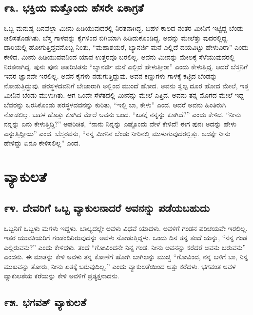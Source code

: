 \section{\num{೯೩. } ಭಕ್ತಿಯ ಮತ್ತೊಂದು ಹೆಸರೇ ಏಕಾಗ್ರತೆ}

ಒಬ್ಬ ಮನುಷ್ಯ ದಿನವೆಲ್ಲಾ ಮೀನು ಹಿಡಿಯುವುದರಲ್ಲಿ ನಿರತನಾಗಿದ್ದ. ಬಹಳ ಕಾಲದ ನಂತರ ಮೀನಿಗೆ ಇಟ್ಟಿದ್ದ ಬೆಂಡು ಚಲಿಸತೊಡಗಿತು. ಬೆಸ್ತ ಗಾಳವನ್ನು ಕೈಗಳಿಂದ ಬಿಗಿಯಾಗಿ ಹಿಡಿದುಕೊಂಡಿದ್ದ. ಅದನ್ನು ಮೇಲೆತ್ತು ವುದರಲ್ಲಿದ್ದ. ದಾರಿಯಲ್ಲಿ ಹೋಗುತ್ತಿದ್ದವನೊಬ್ಬ ನಿಂತು, “ಮಹಾಶಯರೆ, ಬ್ಯಾನರ್ಜಿ ಮನೆ ಎಲ್ಲಿದೆ ದಯವಿಟ್ಟು ಹೇಳುವಿರಾ” ಎಂದು ಕೇಳಿದ. ಮೀನು ಹಿಡಿಯುವವನಿಂದ ಯಾವ ಉತ್ತರವೂ ಬರಲಿಲ್ಲ. ಅವನು ಮೀನನ್ನು ಮೇಲಕ್ಕೆ ಸೆಳೆಯುವುದರಲ್ಲಿ ನಿರತನಾಗಿದ್ದ. ಪುನಃ ಪುನಃ ಅಪರಿಚಿತನು “ಬ್ಯಾನರ್ಜಿ ಮನೆ ಎಲ್ಲಿದೆ ಹೇಳುತ್ತೀರಾ” ಎಂದು ಕೇಳುತ್ತಿದ್ದ. ಆದರೆ ಬೆಸ್ತನಿಗೆ ಇದರ ಜ್ಞಾನವೇ ಇರಲಿಲ್ಲ. ಅವನ ಕೈಗಳು ನಡುಗುತ್ತಿದ್ದುವು. ಅವನ ಕಣ್ಣುಗಳು ಗಾಳಕ್ಕೆ ಕಟ್ಟಿದ ಬೆಂಡನ್ನು ನೋಡುತ್ತಿದ್ದುವು. ಪರಸ್ಥಳದವನಿಗೆ ಬೇಜಾರಾಗಿ ಅಲ್ಲಿಂದ ಮುಂದೆ ಹೋದ. ಅವನು ಸ್ವಲ್ಪ ದೂರ ಹೋದ ಮೇಲೆ, ಇತ್ತ ಮೀನಿನ ಬೆಂಡು ಮುಳುಗಿತು. ಆಗ ಒಂದೇ ಸೆಳೆತದಲ್ಲಿ ಮೀನನ್ನು ಮೇಲೆ ಎತ್ತಿದ. ಅವನು ತನ್ನ ಮೊಗದ ಮೇಲೆ ಇದ್ದ ಬೆವರನ್ನು ಒರಸಿಕೊಂಡು ಪರಸ್ಥಳದವನನ್ನು ಕುರಿತು, “ಇಲ್ಲಿ ಬಾ, ಕೇಳು” ಎಂದ. ಆದರೆ ಅವನು ಹಿಂತಿರುಗಿ ನೋಡಲಿಲ್ಲ. ಬಹಳ ಹೊತ್ತು ಕೂಗಿದ ಮೇಲೆ ಅವನು ಬಂದ. “ಏತಕ್ಕೆ ನನ್ನನ್ನು ಕೂಗಿದೆ?” ಎಂದು ಕೇಳಿದ. “ನೀನು ನನ್ನನ್ನು ಏನು ಕೇಳುತ್ತಿದ್ದಿ?” ಅಪರಿಚಿತ, “ನಾನು ನಿನ್ನನ್ನು ಎಷ್ಟೊಂದು ವೇಳೆ ಕೇಳಿದೆ! ಈಗ ಪುನಃ ಅದನ್ನು ಹೇಳು ಎನ್ನುತ್ತಿದ್ದೀಯ” ಎಂದ. ಬೆಸ್ತರವನು, “ನನ್ನ ಮೀನಿನ ಬೆಂಡು ನೀರಿನಲ್ಲಿ ಮುಳುಗುವುದರಲ್ಲಿತ್ತು. ಅದಕ್ಕೇ ನೀನು ಹೇಳಿದ್ದು ಏನೂ ಕೇಳಿಸಲಿಲ್ಲ” ಎಂದ.


\chapter{ವ್ಯಾಕುಲತೆ}

\section{\num{೯೪. } ದೇವರಿಗೆ ಒಬ್ಬ ವ್ಯಾಕುಲನಾದರೆ ಅವನನ್ನು ಪಡೆಯಬಹುದು}

ಒಬ್ಬನಿಗೆ ಒಬ್ಬಳು ಮಗಳು ಇದ್ದಳು. ಬಾಲ್ಯದಲ್ಲೇ ಅವಳು ವಿಧವೆ ಯಾದಳು. ಅವಳಿಗೆ ಗಂಡನ ಪರಿಚಯವೇ ಇರಲಿಲ್ಲ. ಇತರ ಯುವತಿಯರಿಗೆ ಗಂಡಂದಿರಿರುವುದನ್ನು ಅವಳು ನೋಡುತ್ತಿದ್ದಳು. ಒಂದು ದಿನ ತನ್ನ ತಂದೆ ಯನ್ನು, “ನನ್ನ ಗಂಡ ಎಲ್ಲಿರುವನು?” ಎಂದು ಕೇಳಿದಳು. ತಂದೆ “ಗೋವಿಂದನೇ ನಿನ್ನ ಗಂಡ. ನೀನು ಅವನನ್ನು ಕರೆದರೆ ಅವನು ಬರುವನು” ಎಂದನು. ಈ ಮಾತನ್ನು ಕೇಳಿ ಅವಳು ತನ್ನ ಕೋಣೆಗೆ ಹೋಗಿ ಬಾಗಿಲನ್ನು ಮುಚ್ಚಿ “ಗೋವಿಂದ, ನನ್ನ ಬಳಿಗೆ ಬಾ, ನಿನ್ನ ಮುಖವನ್ನು ತೋರು, ನೀನು ಏತಕ್ಕೆ ಬರುವುದಿಲ್ಲ,” ಎಂದು ವ್ಯಾಕುಲತೆಯಿಂದ ಅತ್ತು ಕರೆದಳು. ಭಗವಂತ ಅವಳ ವ್ಯಾಕುಲತೆಯ ಕರೆಯನ್ನು ಕೇಳಿ ಅವಳಿಗೆ ಪ್ರತ್ಯಕ್ಷನಾದನು.


\section{\num{೯೫. } ಭಗವತ್ ವ್ಯಾಕುಲತೆ}

